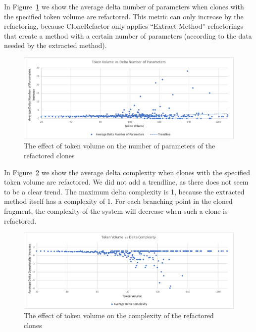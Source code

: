 In Figure~\ref{fig:numberofparameters} we show the average delta number of parameters when clones with the specified token volume are refactored. This metric can only increase by the refactoring, because CloneRefactor only applies ``Extract Method'' refactorings that create a method with a certain number of parameters (according to the data needed by the extracted method).

\begin{figure}[H]
  \includegraphics[width=1\textwidth]{img/numberofparameters}
  \caption{The effect of token volume on the number of parameters of the refactored clones}
  \label{fig:numberofparameters}
\end{figure}

In Figure~\ref{fig:complexity} we show the average delta complexity when clones with the specified token volume are refactored. We did not add a trendline, as there does not seem to be a clear trend. The maximum delta complexity is 1, because the extracted method itself has a complexity of 1. For each branching point in the cloned fragment, the complexity of the system will decrease when such a clone is refactored.

\begin{figure}[H]
  \includegraphics[width=1\textwidth]{img/complexity}
  \caption{The effect of token volume on the complexity of the refactored clones}
  \label{fig:complexity}
\end{figure}



